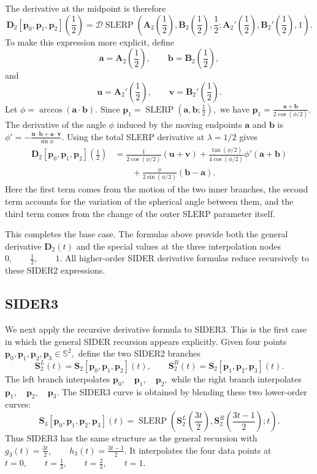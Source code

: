 \documentclass[a4paper,11pt]{article}
\newcommand{\bp}{\mathbf{p}}
\newcommand{\ba}{\mathbf{a}}
\newcommand{\bb}{\mathbf{b}}
\newcommand{\bu}{\mathbf{u}}
\newcommand{\bv}{\mathbf{v}}
\newcommand{\bA}{\mathbf{A}}
\newcommand{\bB}{\mathbf{B}}
\newcommand{\bD}{\mathbf{D}}
\numberwithin{equation}{section}
\theoremstyle{plain}
\theoremstyle{definition}
\theoremstyle{remark}
\newcommand{\Sph}{\mathbb{S}^2}
\newcommand{\slerp}{\operatorname{SLERP}}
\begin{document}
The derivative at the midpoint is therefore
\[
\boxed{
        \bD_2[\bp_0,\bp_1,\bp_2]\!\left(\frac12\right)
        =
        \mathcal{D}\slerp
        \left(
        \bA_2\!\left(\frac12\right),
        \bB_2\!\left(\frac12\right),
        \frac12;
        \bA_2'\!\left(\frac12\right),
        \bB_2'\!\left(\frac12\right),
        1
        \right).
}
\]
To make this expression more explicit, define
\[
        \ba=\bA_2\!\left(\frac12\right),
        \qquad
        \bb=\bB_2\!\left(\frac12\right),
\]
and
\[
        \bu=\bA_2'\!\left(\frac12\right),
        \qquad
        \bv=\bB_2'\!\left(\frac12\right).
\]
Let
\(\phi=\arccos(\ba\cdot \bb).\)
Since
\(\bp_1=\slerp\!\left(\ba,\bb;\frac12\right),\)
we have
\(\bp_1= \frac{\ba+\bb}{2\cos(\phi/2)}.\)
The derivative of the angle $\phi$ induced by the moving endpoints $\ba$ and $\bb$ is
\(\phi' = -\frac{\bu\cdot \bb+\ba\cdot \bv}{\sin\phi}.\)
Using the total SLERP derivative at $\lambda=1/2$ gives
\[
\boxed{
\begin{aligned}
        \bD_2[\bp_0,\bp_1,\bp_2]\!\left(\frac12\right)
        &=
        \frac{1}{2\cos(\phi/2)}(\bu+\bv)
        +
        \frac{\tan(\phi/2)}{4\cos(\phi/2)}\phi'(\ba+\bb)
        \\
        &\qquad
        +
        \frac{\phi}{2\sin(\phi/2)}(\bb-\ba).
\end{aligned}
}
\]
Here the first term comes from the motion of the two inner branches, the second term accounts for the variation of the spherical angle between them, and the third term comes from the change of the outer SLERP parameter itself.

This completes the base case.  The formulas above provide both the general derivative $\bD_2(t)$ and the special values at the three interpolation nodes
\(0,\qquad \frac12,\qquad 1.\)
All higher-order SIDER derivative formulas reduce recursively to these SIDER2 expressions.

\subsection{SIDER3}

We next apply the recursive derivative formula to SIDER3.  This is the first case in which the general SIDER recursion appears explicitly.  Given four points
\(\bp_0,\bp_1,\bp_2,\bp_3\in \Sph,\)
define the two SIDER2 branches
\[
        \mathbf{S}_2^L(t)
        =
        \mathbf{S}_2[\bp_0,\bp_1,\bp_2](t),
        \qquad
        \mathbf{S}_2^R(t)
        =
        \mathbf{S}_2[\bp_1,\bp_2,\bp_3](t).
\]
The left branch interpolates
\(\bp_0,\quad \bp_1,\quad \bp_2,\)
while the right branch interpolates
\(\bp_1,\quad \bp_2,\quad \bp_3.\)
The SIDER3 curve is obtained by blending these two lower-order curves:
\[
        \mathbf{S}_3[\bp_0,\bp_1,\bp_2,\bp_3](t)
        =
        \slerp\left(
        \mathbf{S}_2^L\!\left(\frac{3t}{2}\right),
        \mathbf{S}_2^R\!\left(\frac{3t-1}{2}\right);
        t
        \right).
\]
Thus SIDER3 has the same structure as the general recursion with
\(g_3(t)=\frac{3t}{2}, \qquad h_3(t)=\frac{3t-1}{2}.\)
It interpolates the four data points at
\(t=0,\qquad t=\frac13,\qquad t=\frac23,\qquad t=1.\)
\end{document}
